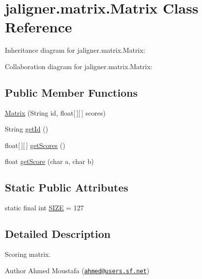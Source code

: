 \hypertarget{classjaligner_1_1matrix_1_1_matrix}{\section{jaligner.\+matrix.\+Matrix Class Reference}
\label{classjaligner_1_1matrix_1_1_matrix}
}


Inheritance diagram for jaligner.\+matrix.\+Matrix\+:


Collaboration diagram for jaligner.\+matrix.\+Matrix\+:
\subsection*{Public Member Functions}
\begin{DoxyCompactItemize}
\item 
\hyperlink{classjaligner_1_1matrix_1_1_matrix_adcd6fde8b26088a4ba88d13bad4730db}{Matrix} (String id, float\mbox{[}$\,$\mbox{]}\mbox{[}$\,$\mbox{]} scores)
\item 
String \hyperlink{classjaligner_1_1matrix_1_1_matrix_ab59872fac3104e3061d65e8cd0e3a1fb}{get\+Id} ()
\item 
float\mbox{[}$\,$\mbox{]}\mbox{[}$\,$\mbox{]} \hyperlink{classjaligner_1_1matrix_1_1_matrix_a813895a2ef37875372d5edc9a6ff9e1b}{get\+Scores} ()
\item 
float \hyperlink{classjaligner_1_1matrix_1_1_matrix_a6bd8bdab7fab62b94e8f53a81f27c87d}{get\+Score} (char a, char b)
\end{DoxyCompactItemize}
\subsection*{Static Public Attributes}
\begin{DoxyCompactItemize}
\item 
static final int \hyperlink{classjaligner_1_1matrix_1_1_matrix_a3b67208fde3868e8ba53d4c384cde39a}{S\+I\+Z\+E} = 127
\end{DoxyCompactItemize}


\subsection{Detailed Description}
Scoring matrix.

\begin{DoxyAuthor}{Author}
Ahmed Moustafa (\href{mailto:ahmed@users.sf.net}{\tt ahmed@users.\+sf.\+net}) 
\end{DoxyAuthor}



